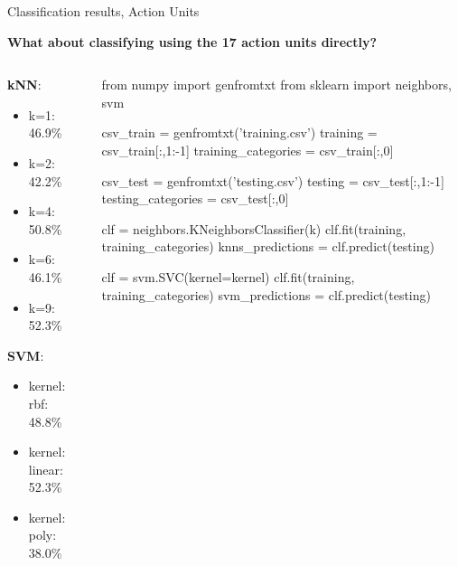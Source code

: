 \documentclass[compress]{beamer}
\begin{document}
\begin{frame}[fragile]{Classification results, Action Units}
    

    \begin{center}
        {\bf What about classifying using the 17 action units directly?}
    \end{center}

    \begin{columns}
        \begin{column}{0.4\linewidth}
    {\bf kNN}:
    \begin{itemize}
        \item k=1: 46.9\%
        \item k=2: 42.2\%
        \item k=4: 50.8\%
        \item k=6: 46.1\%
        \item k=9: 52.3\%
    \end{itemize}

    {\bf SVM}:

    \begin{itemize}
        \item kernel: rbf: 48.8\%
        \item kernel: linear: 52.3\%
        \item kernel: poly: 38.0\%
    \end{itemize}

        \end{column}
        \begin{column}{0.6\linewidth}
            \begin{pythoncode}
from numpy import genfromtxt
from sklearn import neighbors, svm

csv_train = genfromtxt('training.csv')
training = csv_train[:,1:-1]
training_categories = csv_train[:,0]

csv_test = genfromtxt('testing.csv')
testing = csv_test[:,1:-1]
testing_categories = csv_test[:,0]

clf = neighbors.KNeighborsClassifier(k)
clf.fit(training, training_categories)
knns_predictions = clf.predict(testing)

clf = svm.SVC(kernel=kernel)
clf.fit(training, training_categories)
svm_predictions = clf.predict(testing)

            \end{pythoncode}
        \end{column}
    \end{columns}

\end{frame}
\end{document}
